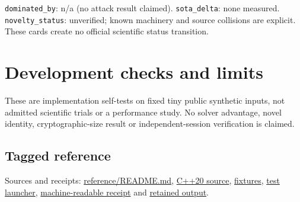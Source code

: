 \documentclass[
  10pt,
]{article}
\begin{document}
\texttt{dominated\_by}: n/a (no attack result claimed).
\texttt{sota\_delta}: none measured. \texttt{novelty\_status}:
unverified; known machinery and source collisions are explicit. These
cards create no official scientific status transition.

\newpage

\section{Development checks and
limits}\label{development-checks-and-limits}

These are implementation self-tests on fixed tiny public synthetic
inputs, not admitted scientific trials or a performance study. No solver
advantage, novel identity, cryptographic-size result or
independent-session verification is claimed.

\subsection{Tagged reference}\label{tagged-reference}

Sources and receipts: \url{reference/README.md},
\href{reference/tagged_reference.cpp}{C++20 source},
\href{reference/fixtures.tsv}{fixtures}, \href{reference/test.sh}{test
launcher}, \href{reference/development-validation.json}{machine-readable
receipt} and \href{reference/development-validation.txt}{retained
output}.
\end{document}

